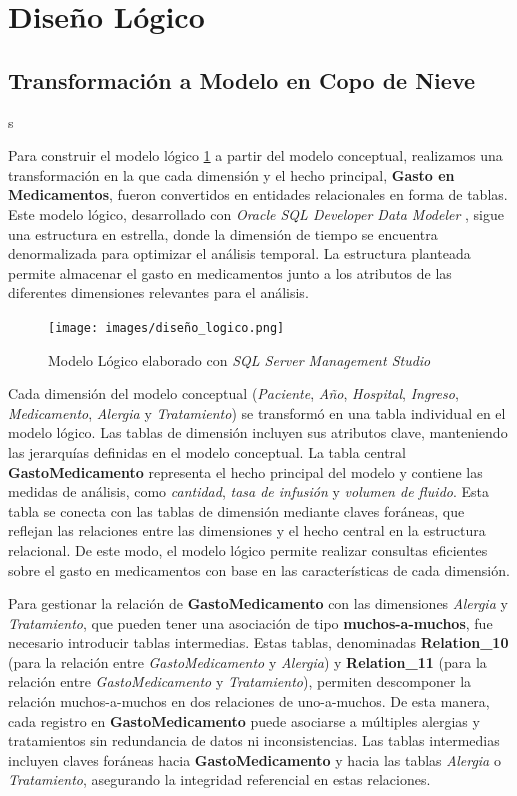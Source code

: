 \documentclass{article}
\begin{document}
\section{Diseño Lógico}
\label{sec:diseno_logico}
\subsection{Transformación a Modelo en Copo de Nieve}
s

Para construir el modelo lógico \ref{fig:logico} a partir del modelo conceptual, realizamos una transformación en la que cada dimensión y el hecho principal, \textbf{Gasto en Medicamentos}, fueron convertidos en entidades relacionales en forma de tablas. Este modelo lógico, desarrollado con \textit{Oracle SQL Developer Data Modeler} \cite{oracle_datamodeler}, sigue una estructura en estrella, donde la dimensión de tiempo se encuentra denormalizada para optimizar el análisis temporal. La estructura planteada permite almacenar el gasto en medicamentos junto a los atributos de las diferentes dimensiones relevantes para el análisis. 


\begin{figure}[H]
	\centering
	\texttt{[image: images/diseño\_logico.png]}
	\caption{Modelo Lógico elaborado con \textit{SQL Server Management Studio} \cite{sqlserver_managementstudio}}
	\label{fig:logico}
\end{figure}
Cada dimensión del modelo conceptual (\textit{Paciente}, \textit{Año}, \textit{Hospital}, \textit{Ingreso}, \textit{Medicamento}, \textit{Alergia} y \textit{Tratamiento}) se transformó en una tabla individual en el modelo lógico. Las tablas de dimensión incluyen sus atributos clave, manteniendo las jerarquías definidas en el modelo conceptual. La tabla central \textbf{GastoMedicamento} representa el hecho principal del modelo y contiene las medidas de análisis, como \textit{cantidad}, \textit{tasa de infusión} y \textit{volumen de fluido}. Esta tabla se conecta con las tablas de dimensión mediante claves foráneas, que reflejan las relaciones entre las dimensiones y el hecho central en la estructura relacional. De este modo, el modelo lógico permite realizar consultas eficientes sobre el gasto en medicamentos con base en las características de cada dimensión.

Para gestionar la relación de \textbf{GastoMedicamento} con las dimensiones \textit{Alergia} y \textit{Tratamiento}, que pueden tener una asociación de tipo \textbf{muchos-a-muchos}, fue necesario introducir tablas intermedias. Estas tablas, denominadas \textbf{Relation\_10} (para la relación entre \textit{GastoMedicamento} y \textit{Alergia}) y \textbf{Relation\_11} (para la relación entre \textit{GastoMedicamento} y \textit{Tratamiento}), permiten descomponer la relación muchos-a-muchos en dos relaciones de uno-a-muchos. De esta manera, cada registro en \textbf{GastoMedicamento} puede asociarse a múltiples alergias y tratamientos sin redundancia de datos ni inconsistencias. Las tablas intermedias incluyen claves foráneas hacia \textbf{GastoMedicamento} y hacia las tablas \textit{Alergia} o \textit{Tratamiento}, asegurando la integridad referencial en estas relaciones.
\end{document}
